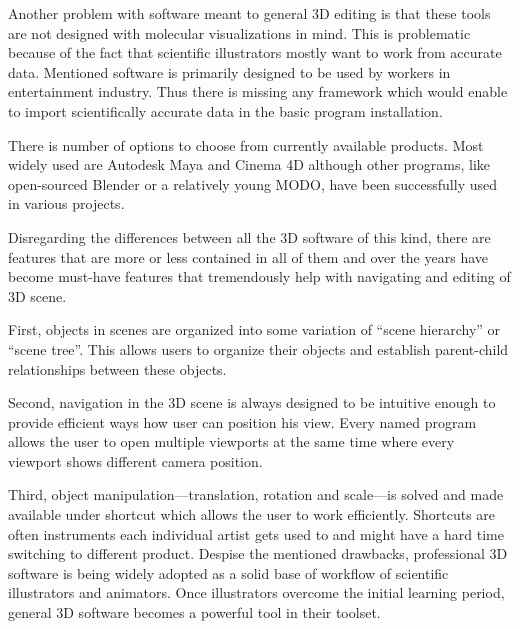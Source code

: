 \documentclass[
  digital, %
  table,   %
  nolof,     %
  nolot,     %
]{fithesis3}
\begin{document}
Another problem with software meant to general 3D editing is that these tools are not designed with molecular visualizations in mind. This is problematic because of the fact that scientific illustrators mostly want to work from accurate data. Mentioned software is primarily designed to be used by workers in entertainment industry. Thus there is missing any framework which would enable to import scientifically accurate data in the basic program installation.

There is number of options to choose from currently available products. Most widely used are Autodesk Maya and Cinema 4D although other programs, like open-sourced Blender or a relatively young MODO\cite{MODOscientificIll}, have been successfully used in various projects.


Disregarding the differences between all the 3D software of this kind, there are features that are more or less contained in all of them and over the years have become must-have features that tremendously help with navigating and editing of 3D scene.

First, objects in scenes are organized into some variation of ``scene hierarchy'' or ``scene tree''. This allows users to organize their objects and establish parent-child relationships between these objects.

Second, navigation in the 3D scene is always designed to be intuitive enough to provide efficient ways how user can position his view. Every named program allows the user to open multiple viewports at the same time where every viewport shows different camera position.

Third, object manipulation—translation, rotation and scale—is solved and made available under shortcut which allows the user to work efficiently. Shortcuts are often instruments each individual artist gets used to and might have a hard time switching to different product.
Despise the mentioned drawbacks, professional 3D software is being widely adopted as a solid base of workflow of scientific illustrators and animators. Once illustrators overcome the initial learning period, general 3D software becomes a powerful tool in their toolset. 
\end{document}

